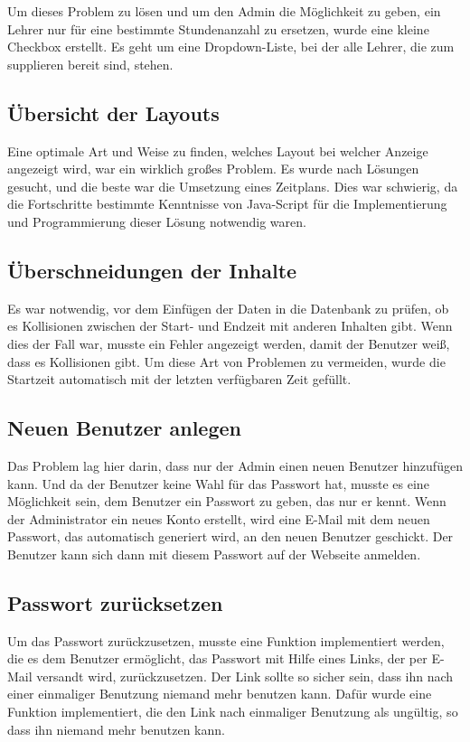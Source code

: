 Um dieses Problem zu lösen und um den Admin die Möglichkeit zu geben, ein Lehrer nur für eine bestimmte Stundenanzahl zu ersetzen, wurde eine kleine Checkbox erstellt. Es geht um eine Dropdown-Liste, bei der alle Lehrer, die zum supplieren bereit sind, stehen. 

\subsection{Übersicht der Layouts}

Eine optimale Art und Weise zu finden, welches Layout bei welcher Anzeige angezeigt wird, war ein wirklich großes Problem. Es wurde nach Lösungen gesucht, und die beste war die Umsetzung eines Zeitplans. Dies war schwierig, da die Fortschritte bestimmte Kenntnisse von Java-Script für die Implementierung und Programmierung dieser Lösung notwendig waren. 

\subsection{Überschneidungen der Inhalte}

Es war notwendig, vor dem Einfügen der Daten in die Datenbank zu prüfen, ob es Kollisionen zwischen der Start- und Endzeit mit anderen Inhalten gibt. Wenn dies der Fall war, musste ein Fehler angezeigt werden, damit der Benutzer weiß, dass es Kollisionen gibt. Um diese Art von Problemen zu vermeiden, wurde die Startzeit automatisch mit der letzten verfügbaren Zeit gefüllt.


\subsection{Neuen Benutzer anlegen}

Das Problem lag hier darin, dass nur der Admin einen neuen Benutzer hinzufügen kann.  Und da der Benutzer keine Wahl für das Passwort hat, musste es eine Möglichkeit sein, dem Benutzer ein Passwort zu geben, das nur er kennt. Wenn der Administrator ein neues Konto erstellt, wird eine E-Mail mit dem neuen Passwort, das automatisch generiert wird, an den neuen Benutzer geschickt. Der Benutzer kann sich dann mit diesem Passwort auf der Webseite anmelden. 

\subsection{Passwort zurücksetzen}

Um das Passwort zurückzusetzen, musste eine Funktion implementiert werden, die es dem Benutzer ermöglicht, das Passwort mit Hilfe eines Links, der per E-Mail versandt wird, zurückzusetzen. Der Link sollte so sicher sein, dass ihn nach einer  einmaliger Benutzung niemand mehr benutzen kann. Dafür wurde eine Funktion implementiert, die den Link nach einmaliger Benutzung als ung\"ultig, so dass ihn niemand mehr benutzen kann.

